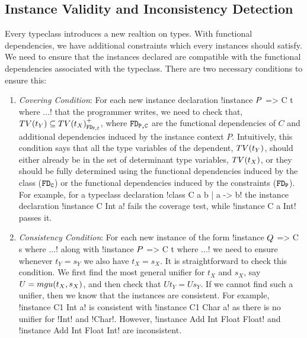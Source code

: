 \documentclass[format=acmsmall,manuscript,review,screen,nonacm,margin=1in,11pt]{acmart}
\begin{document}
\subsection{Instance Validity and Inconsistency Detection}
Every typeclass introduces a new realtion on types. With functional dependencies,
we have additional constraints which every instances should satisfy.
We need to ensure that the instances declared are compatible
with the functional dependencies associated with the typeclass.
There are two necessary conditions to ensure this:
\begin{enumerate}[topsep={0pt},partopsep={0pt}]
\item\emph{Covering Condition}:  For each new instance declaration !instance $P$ => C t where ...!
  that the programmer writes, we need to check that,%
  $TV(t_Y) \subseteq {TV(t_X)}^{+}_{\texttt{FD}_\texttt{{P,C}}}$,
  where $\texttt{FD}_\texttt{{P,C}}$ are the functional dependencies of $C$ and additional dependencies
  induced by the instance context $P$. Intuitively, this condition says that
  all the type variables of the dependent, $TV(t_Y)$, should either already be in the
  set of determinant type variables, $TV(t_X)$, or they should be fully determined using the
  functional dependencies induced by the class ($\texttt{FD}_\texttt{C}$) or the functional dependencies
  induced by the constraints ($\texttt{FD}_\texttt{P}$). For example, for a typeclass declaration
  !class C a b |  a -> b! the instance declaration !instance C Int a! fails the coverage test,
  while !instance C a Int! passes it.
\item\emph{Consistency Condition}: For each new instance of the form !instance $Q$ => C s where ...!
  along with !instance $P$ => C t where ...! we need to ensure whenever $t_Y = s_Y$ we also have $t_X = s_X$.
  It is straightforward to check this condition. We first find the most general unifier for $t_X$ and $s_X$,
  say $U=mgu(t_X,s_X) $, and then check that $U t_Y = U s_Y$. If we cannot find such a unifier, then we know that
  the instances are consistent. For example, !instance C1 Int a! is consistent with !instance C1 Char a!
  as there is no unifier for !Int! and !Char!. However, !instance Add Int Float Float!
  and !instance Add Int Float Int! are inconsistent.%
\end{enumerate}
\end{document}
